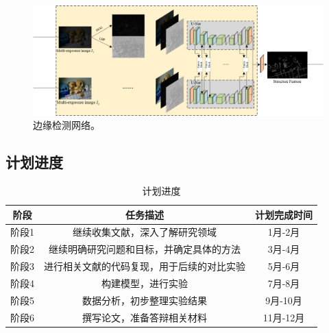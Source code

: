 \documentclass[a4paper]{ctexart}
\begin{document}
	
	
	\begin{figure}[htb]
		\centering 
		\includegraphics[width=\columnwidth]{picture/LLIE/My Architecture/Edge Detection Network}
		\caption{
			\label{fig: Edge Detection Network} 
			边缘检测网络。
		}
	\end{figure}
	\FloatBarrier
	
	\subsection{计划进度}

	\begin{table}[!htbp]
		\centering
			\begin{tabular}{ccc}
				\toprule
				阶段  & 任务描述                                                & 计划完成时间 \\
				\midrule
				阶段1 & 继续收集文献，深入了解研究领域        	                 & 1月-2月     \\
				阶段2 & 继续明确研究问题和目标，并确定具体的方法                   & 3月-4月     \\
				阶段3 & 进行相关文献的代码复现，用于后续的对比实验                 & 5月-6月     \\
				阶段4 & 构建模型，进行实验                                       & 7月-8月     \\
				阶段5 & 数据分析，初步整理实验结果                                & 9月-10月    \\
				阶段6 & 撰写论文，准备答辩相关材料                                & 11月-12月   \\
				\bottomrule
			\end{tabular}
		\caption{
			\label{tab: Schedule}
			计划进度
		} 
	\end{table}
	
\end{document}
